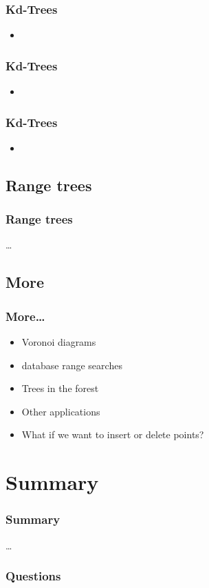 \documentclass{beamer}
\begin{document}
\begin{frame}
  \frametitle{Kd-Trees}
  \begin{itemize}
  \item 
  \end{itemize}
\end{frame}

\begin{frame}
  \frametitle{Kd-Trees}
  \begin{itemize}
  \item 
  \end{itemize}
\end{frame}

\begin{frame}
  \frametitle{Kd-Trees}
  \begin{itemize}
  \item 
  \end{itemize}
\end{frame}

\subsection{Range trees}

\begin{frame}
  \frametitle{Range trees}
  \dots
\end{frame}

\subsection{More}

\begin{frame}
  \frametitle{More\dots}
  \begin{itemize}
  \item Voronoi diagrams
  \item database range searches
  \item Trees in the forest
  \item Other applications
  \item What if we want to insert or delete points?
  \end{itemize}
\end{frame}

\section*{Summary}

\begin{frame}
  \frametitle{Summary}  
  \dots
\end{frame}

\begin{frame}
  \frametitle{Questions}  
\end{frame}
\end{document}
